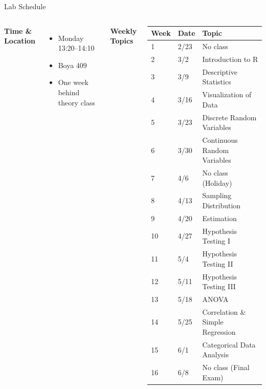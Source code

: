 \documentclass{beamer}					%
\begin{document}
\begin{frame}{Lab Schedule}

\begin{columns}[T]

\textbf{Time \& Location}

\vspace{0.5em}
\begin{itemize}
    \item Monday 13:20--14:10
    \item Boya 409
    \item One week behind theory class
\end{itemize}

\textbf{Weekly Topics}

\vspace{0.5em}

\small
\renewcommand{\arraystretch}{1.0}
\begin{tabular}{lll}
\toprule
\textbf{Week} & \textbf{Date} & \textbf{Topic} \\
\midrule
1  & 2/23 & No class \\
2  & 3/2  & Introduction to R \\
3  & 3/9  & Descriptive Statistics \\
4  & 3/16 & Visualization of Data \\
5  & 3/23 & Discrete Random Variables \\
6  & 3/30 & Continuous Random Variables \\
7  & 4/6  & No class (Holiday) \\
8  & 4/13 & Sampling Distribution \\
9  & 4/20 & Estimation \\
10 & 4/27 & Hypothesis Testing I \\
11 & 5/4  & Hypothesis Testing II \\
12 & 5/11 & Hypothesis Testing III \\
13 & 5/18 & ANOVA \\
14 & 5/25 & Correlation \& Simple Regression \\
15 & 6/1  & Categorical Data Analysis \\
16 & 6/8  & No class (Final Exam) \\
\bottomrule
\end{tabular}
\end{columns}
\end{frame}
\end{document}
